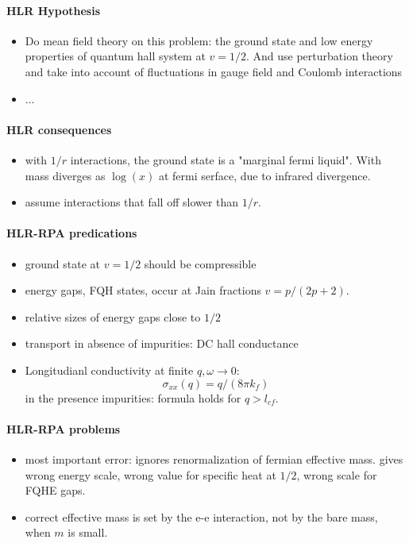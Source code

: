 \documentclass{article}
\numberwithin{equation}{subsection} %
\theoremstyle{definition}
\begin{document}
\paragraph{HLR Hypothesis}
\begin{itemize}
    \item Do mean field theory on this problem: the ground state and low
        energy properties of quantum hall system at $v=1/2$. And use
        perturbation theory and take into account of fluctuations in gauge
        field and Coulomb interactions
    \item ...
\end{itemize}
\paragraph{HLR consequences}
\begin{itemize}
    \item with $1/r$ interactions, the ground state is a "marginal fermi
        liquid". With mass diverges as $\log(x)$ at fermi serface, due to
        infrared divergence.
    \item assume interactions that fall off slower than $1/r$.
\end{itemize}
\paragraph{HLR-RPA predications}
\begin{itemize}
    \item ground state at $v=1/2$ should be compressible
    \item energy gaps, FQH states, occur at Jain fractions $v=p/(2p+2)$.
    \item relative sizes of energy gaps close to $1/2$
    \item transport in absence of impurities: DC hall conductance
    \item Longitudianl conductivity at finite $q,\omega\to 0$:
        $$\sigma_{xx}(q)=q/(8\pi k_f) $$
        in the presence impurities: formula holds for $q>l_{cf}$.
\end{itemize}
\paragraph{HLR-RPA problems}
\begin{itemize}
    \item most important error: ignores renormalization of fermian
        effective mass. gives wrong energy scale, wrong value for specific
        heat at $1/2$, wrong scale for FQHE gaps.
    \item correct effective mass is set by the e-e interaction, not by the
        bare mass, when $m$ is small.
\end{itemize}
\end{document}
